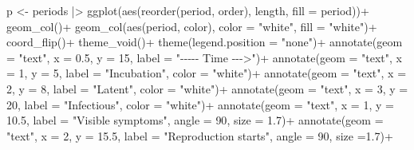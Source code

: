 \documentclass[
  letterpaper,
]{book}
\newenvironment{Shaded}{\begin{snugshade}}{\end{snugshade}}
\newcommand{\AttributeTok}[1]{\textcolor[rgb]{0.40,0.45,0.13}{#1}}
\newcommand{\DecValTok}[1]{\textcolor[rgb]{0.68,0.00,0.00}{#1}}
\newcommand{\FloatTok}[1]{\textcolor[rgb]{0.68,0.00,0.00}{#1}}
\newcommand{\FunctionTok}[1]{\textcolor[rgb]{0.28,0.35,0.67}{#1}}
\newcommand{\NormalTok}[1]{\textcolor[rgb]{0.00,0.23,0.31}{#1}}
\newcommand{\OtherTok}[1]{\textcolor[rgb]{0.00,0.23,0.31}{#1}}
\newcommand{\SpecialCharTok}[1]{\textcolor[rgb]{0.37,0.37,0.37}{#1}}
\newcommand{\StringTok}[1]{\textcolor[rgb]{0.13,0.47,0.30}{#1}}
\begin{document}
\begin{Shaded}
\begin{Highlighting}[]
\NormalTok{p }\OtherTok{\textless{}{-}}\NormalTok{ periods }\SpecialCharTok{|\textgreater{}} 
  \FunctionTok{ggplot}\NormalTok{(}\FunctionTok{aes}\NormalTok{(}\FunctionTok{reorder}\NormalTok{(period, order), length, }\AttributeTok{fill =}\NormalTok{ period))}\SpecialCharTok{+}
  \FunctionTok{geom\_col}\NormalTok{()}\SpecialCharTok{+}
  \FunctionTok{geom\_col}\NormalTok{(}\FunctionTok{aes}\NormalTok{(period, color), }\AttributeTok{color =} \StringTok{"white"}\NormalTok{, }\AttributeTok{fill =} \StringTok{"white"}\NormalTok{)}\SpecialCharTok{+}
  \FunctionTok{coord\_flip}\NormalTok{()}\SpecialCharTok{+}
  \FunctionTok{theme\_void}\NormalTok{()}\SpecialCharTok{+}
  \FunctionTok{theme}\NormalTok{(}\AttributeTok{legend.position =} \StringTok{"none"}\NormalTok{)}\SpecialCharTok{+}
  \FunctionTok{annotate}\NormalTok{(}\AttributeTok{geom =} \StringTok{"text"}\NormalTok{, }\AttributeTok{x =} \FloatTok{0.5}\NormalTok{, }\AttributeTok{y =} \DecValTok{15}\NormalTok{, }\AttributeTok{label =} \StringTok{"{-}{-}{-}{-}{-} Time {-}{-}{-}\textgreater{}"}\NormalTok{)}\SpecialCharTok{+}
  \FunctionTok{annotate}\NormalTok{(}\AttributeTok{geom =} \StringTok{"text"}\NormalTok{, }\AttributeTok{x =} \DecValTok{1}\NormalTok{, }\AttributeTok{y =} \DecValTok{5}\NormalTok{, }\AttributeTok{label =} \StringTok{"Incubation"}\NormalTok{, }\AttributeTok{color =} \StringTok{"white"}\NormalTok{)}\SpecialCharTok{+}
  \FunctionTok{annotate}\NormalTok{(}\AttributeTok{geom =} \StringTok{"text"}\NormalTok{, }\AttributeTok{x =} \DecValTok{2}\NormalTok{, }\AttributeTok{y =} \DecValTok{8}\NormalTok{, }\AttributeTok{label =} \StringTok{"Latent"}\NormalTok{, }\AttributeTok{color =} \StringTok{"white"}\NormalTok{)}\SpecialCharTok{+}
  \FunctionTok{annotate}\NormalTok{(}\AttributeTok{geom =} \StringTok{"text"}\NormalTok{, }\AttributeTok{x =} \DecValTok{3}\NormalTok{, }\AttributeTok{y =} \DecValTok{20}\NormalTok{, }\AttributeTok{label =} \StringTok{"Infectious"}\NormalTok{, }\AttributeTok{color =} \StringTok{"white"}\NormalTok{)}\SpecialCharTok{+}
  \FunctionTok{annotate}\NormalTok{(}\AttributeTok{geom =} \StringTok{"text"}\NormalTok{, }\AttributeTok{x =} \DecValTok{1}\NormalTok{, }\AttributeTok{y =} \FloatTok{10.5}\NormalTok{, }\AttributeTok{label =} \StringTok{"Visible symptoms"}\NormalTok{, }\AttributeTok{angle =} \DecValTok{90}\NormalTok{, }\AttributeTok{size =} \FloatTok{1.7}\NormalTok{)}\SpecialCharTok{+}
  \FunctionTok{annotate}\NormalTok{(}\AttributeTok{geom =} \StringTok{"text"}\NormalTok{, }\AttributeTok{x =} \DecValTok{2}\NormalTok{, }\AttributeTok{y =} \FloatTok{15.5}\NormalTok{, }\AttributeTok{label =} \StringTok{"Reproduction starts"}\NormalTok{, }\AttributeTok{angle =} \DecValTok{90}\NormalTok{, }\AttributeTok{size =}\FloatTok{1.7}\NormalTok{)}\SpecialCharTok{+}

\end{Highlighting}
\end{Shaded}
\end{document}
